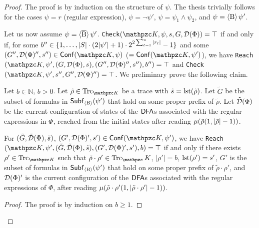 \begin{proof}
The proof is by induction on the structure of $\psi$. The thesis trivially follows for the cases $\psi=r$ (regular expression), $\psi=\neg\psi'$, $\psi=\psi_1\wedge\psi_2$, and $\psi=\operatorname{\langle B\rangle}\psi'$.

Let us now assume $\psi=\operatorname{\langle \overline{B}\rangle}\psi'$. 
\texttt{Check}$(\Ku,\psi,s,G,\Du(\Phi))=\top$ if and only if, for some $b''\in\{1,\ldots , |S|\cdot (2|\psi'|+1)\cdot 2^{2\sum_{\ell=1}^u |r_\ell|}-1 \}$ and some $(G'',\Du(\Phi)'',s'')\in\conf(\Ku,\psi)$ ($=\conf(\Ku,\psi')$), we have \texttt{Reach}$(\Ku,\psi',(G,\Du(\Phi),s),(G'',\Du(\Phi)'', s''),\allowbreak b'')=\top$ and \texttt{Check}$(\Ku,\psi',s'',G'', \Du(\Phi)'')=\top$.
We preliminary prove the following claim.
    \begin{claim}
        Let $b\in\mathbb{N}$, $b>0$.
        Let $\tilde{\rho}\in\Trk_{\Ku}$ be a trace with $\tilde{s}=\operatorname{lst}(\tilde{\rho})$. Let $\tilde{G}$ be the subset of formulas in $\mathsf{Subf}_{\operatorname{\langle B\rangle}}(\psi')$ that hold on some proper prefix of $\tilde{\rho}$.
        Let $\tilde{\mathcal{D}}(\Phi)$ be the current configuration of states of the $\text{\sffamily DFA}$s associated with the regular expressions in $\Phi$, reached from the initial states after reading $\mu(\tilde{\rho}(1,|\tilde{\rho}|-1))$.
        
        For $(\tilde{G},\tilde{\mathcal{D}}(\Phi),\tilde{s})$, $(G',\Du(\Phi)',s')\in\conf(\Ku,\psi')$, we have 
        \texttt{Reach}$(\Ku,\psi',\allowbreak (\tilde{G},\tilde{\Du}(\Phi),\tilde{s}),\allowbreak (G',\Du(\Phi)',s'),b)=\top$ if and only if there exists $\rho'\in\Trk_{\Ku}$ such that $\tilde{\rho}\cdot\rho'\in\Trk_\Ku$, $|\rho'|=b$, $\operatorname{lst}(\rho')=s'$, $G'$ is the subset of formulas in $\mathsf{Subf}_{\operatorname{\langle B\rangle}}(\psi')$ that hold on some proper prefix of $\tilde{\rho}\cdot\rho'$, and $\mathcal{D}(\Phi)'$ is the current configuration of the $\text{\sffamily DFA}$s associated with the regular expressions of $\Phi$, after reading $\mu(\tilde{\rho}\cdot\rho'(1,|\tilde{\rho}\cdot\rho'|-1))$.
    \end{claim}
    \begin{proof}
    The proof is by induction on $b\geq 1$.
    

\end{proof}
\end{proof}
